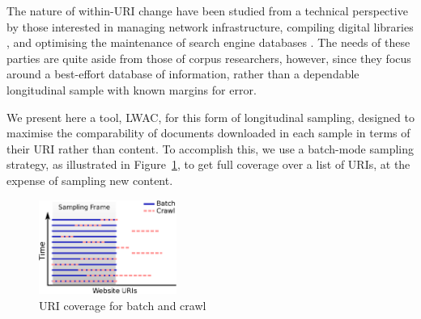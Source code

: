 \documentclass[11pt]{article}
\newcommand{\toolname}{LWAC}
\begin{document}
The nature of within-URI change have been studied from a technical perspective by those interested in managing network infrastructure, compiling digital libraries%
, and optimising the maintenance of search engine databases%
.  The needs of these parties are quite aside from those of corpus researchers, however, since they focus around a best-effort database of information, rather than a dependable longitudinal sample with known margins for error.

% 
% 


We present here a tool, \toolname, for this form of longitudinal sampling, designed to maximise the comparability of documents downloaded in each sample in terms of their URI rather than content.  To accomplish this, we use a batch-mode sampling strategy, as illustrated in Figure~\ref{fig:sampling}, to get full coverage over a list of URIs, at the expense of sampling new content.

\begin{figure}[h]
\centering
\includegraphics[width=0.4\textwidth]{images/samples.eps}
\caption{URI coverage for batch and crawl}
\label{fig:sampling}
\end{figure}
\end{document}
